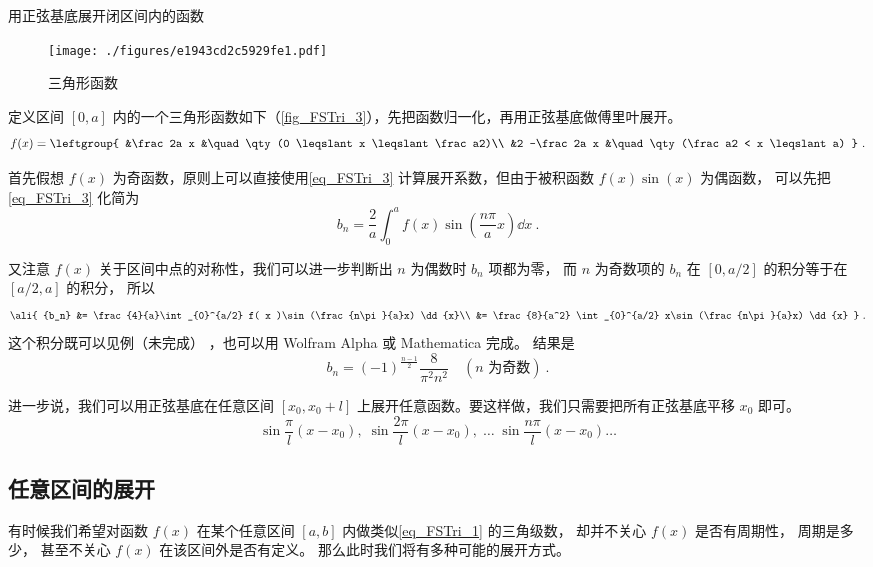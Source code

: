 \begin{example}{用正弦基底展开闭区间内的函数}\label{ex_FSTri_2}

\begin{figure}[ht]
\centering
\texttt{[image: ./figures/e1943cd2c5929fe1.pdf]}
\caption{三角形函数} \label{fig_FSTri_3}
\end{figure}

定义区间 $[0,a]$ 内的一个三角形函数如下（\autoref{fig_FSTri_3}），先把函数归一化，再用正弦基底做傅里叶展开。
\begin{equation}
f(x) = \leftgroup{
&\frac2a x &\quad \qty(0 \leqslant x \leqslant \frac a2)\\
&2 -\frac2a x &\quad \qty(\frac a2 < x \leqslant a)
}~.\end{equation}

首先假想 $f(x)$ 为奇函数，原则上可以直接使用\autoref{eq_FSTri_3} 计算展开系数，但由于被积函数 $f(x)\sin(x)$ 为偶函数， 可以先把\autoref{eq_FSTri_3} 化简为%
\begin{equation}
{b_n} = \frac{2}{a}\int_{0}^a f( x )\sin (\frac{n\pi}{a}x) \dd{x}~.
\end{equation}

又注意 $f(x)$ 关于区间中点的对称性，我们可以进一步判断出 $n$ 为偶数时 $b_n$ 项都为零， 而 $n$ 为奇数项的 $b_n$ 在 $[0, a/2]$ 的积分等于在 $[a/2, a]$ 的积分， 所以
\begin{equation}
\ali{
{b_n} &= \frac{4}{a}\int_{0}^{a/2} f( x )\sin (\frac{n\pi}{a}x) \dd{x}\\
&= \frac{8}{a^2} \int_{0}^{a/2} x\sin (\frac{n\pi}{a}x) \dd{x}
}~.\end{equation}
这个积分既可以见例（未完成）
，也可以用 Wolfram Alpha 或 Mathematica 完成。%
结果是
\begin{equation}
b_n = (-1)^{\frac{n-1}{2}} \frac{8}{\pi^2 n^2} \quad (\text{$n$ 为奇数})~.
\end{equation}
\end{example}
进一步说，我们可以用正弦基底在任意区间 $[x_0,x_0+l]$ 上展开任意函数。要这样做，我们只需要把所有正弦基底平移 $x_0$ 即可。
\begin{equation}
\sin\frac{\pi}{l} (x-x_0),\;   \sin\frac{2\pi}{l} (x-x_0),\;    \dots\;\sin\frac{n\pi}{l} (x-x_0) \dots
\end{equation}

\subsection{任意区间的展开}\label{sub_FSTri_2}
有时候我们希望对函数 $f(x)$ 在某个任意区间 $[a, b]$ 内做类似\autoref{eq_FSTri_1} 的三角级数， 却并不关心 $f(x)$ 是否有周期性， 周期是多少， 甚至不关心 $f(x)$ 在该区间外是否有定义。 那么此时我们将有多种可能的展开方式。

